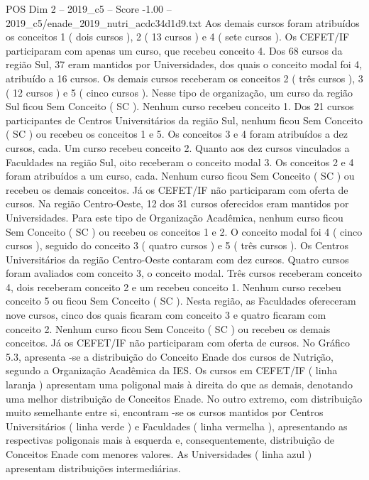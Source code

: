 \begin{textsample}{POS Dim 2 – 2019\_c5 – Score -1.00 – 2019\_c5/enade\_2019\_nutri\_acdc34d1d9.txt}
Aos demais cursos foram atribuídos os conceitos 1 ( dois cursos ), 2 ( 13 cursos ) e 4 ( sete cursos ).
Os CEFET/IF participaram com apenas um curso, que recebeu conceito 4.
Dos 68 cursos da região Sul, 37 eram mantidos por Universidades, dos quais o conceito modal foi 4, atribuído a 16 cursos.
Os demais cursos receberam os conceitos 2 ( três cursos ), 3 ( 12 cursos ) e 5 ( cinco cursos ).
Nesse tipo de organização, um curso da região Sul ficou Sem Conceito ( SC ).
Nenhum curso recebeu conceito 1.
Dos 21 cursos participantes de Centros Universitários da região Sul, nenhum ficou Sem Conceito ( SC ) ou recebeu os conceitos 1 e 5.
Os conceitos 3 e 4 foram atribuídos a dez cursos, cada.
Um curso recebeu conceito 2.
Quanto aos dez cursos vinculados a Faculdades na região Sul, oito receberam o conceito modal 3.
Os conceitos 2 e 4 foram atribuídos a um curso, cada.
Nenhum curso ficou Sem Conceito ( SC ) ou recebeu os demais conceitos.
Já os CEFET/IF não participaram com oferta de cursos.
Na região Centro-Oeste, 12 dos 31 cursos oferecidos eram mantidos por Universidades.
Para este tipo de Organização Acadêmica, nenhum curso ficou Sem Conceito ( SC ) ou recebeu os conceitos 1 e 2.
O conceito modal foi 4 ( cinco cursos ), seguido do conceito 3 ( quatro cursos ) e 5 ( três cursos ).
Os Centros Universitários da região Centro-Oeste contaram com dez cursos.
Quatro cursos foram avaliados com conceito 3, o conceito modal.
Três cursos receberam conceito 4, dois receberam conceito 2 e um recebeu conceito 1.
Nenhum curso recebeu conceito 5 ou ficou Sem Conceito ( SC ).
Nesta região, as Faculdades ofereceram nove cursos, cinco dos quais ficaram com conceito 3 e quatro ficaram com conceito 2.
Nenhum curso ficou Sem Conceito ( SC ) ou recebeu os demais conceitos.
Já os CEFET/IF não participaram com oferta de cursos.
No Gráfico 5.3, apresenta -se a distribuição do Conceito Enade dos cursos de Nutrição, segundo a Organização Acadêmica da IES.
Os cursos em CEFET/IF ( linha laranja ) apresentam uma poligonal mais à direita do que as demais, denotando uma melhor distribuição de Conceitos Enade.
No outro extremo, com distribuição muito semelhante entre si, encontram -se os cursos mantidos por Centros Universitários ( linha verde ) e Faculdades ( linha vermelha ), apresentando as respectivas poligonais mais à esquerda e, consequentemente, distribuição de Conceitos Enade com menores valores.
As Universidades ( linha azul ) apresentam distribuições intermediárias.

\end{textsample}
